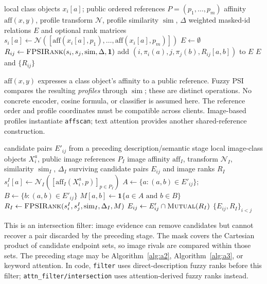 \documentclass[11pt]{article}
\newcommand{\aff}{\mathrm{aff}}
\newcommand{\mutual}{\textsc{Mutual}}
\newcommand{\fprank}{\textsc{FPSIRank}}
\newcommand{\ind}{\mathbf{1}}
\begin{document}
\begin{algorithm}[H]
\caption{Affinity-based relation construction using fuzzy PSI}\label{alg:a3}
\small\begin{algorithmic}[1]
\Require local class objects $x_i[a]$; public ordered references $P=(p_1,\ldots,p_m)$
\Require affinity $\aff(x,y)$, profile transform $\mathcal N$, profile similarity $\operatorname{sim}$, $\Delta$
\Ensure weighted masked-id relations $E$ and optional rank matrices
 \State $s_i[a]\gets\mathcal N([\aff(x_i[a],p_1),\ldots,\aff(x_i[a],p_m)])$
\EndFor
\State $E\gets\emptyset$
 \State $R_{ij}\gets\fprank(s_i,s_j,\operatorname{sim},\Delta,\mathbf 1)$ 
 \For{each $(a,b)\in\mutual(R_{ij})$}
  \State add $(i,\pi_i(a),j,\pi_j(b),R_{ij}[a,b])$ to $E$
 \EndFor
\EndFor
\State \Return $E$ and $\{R_{ij}\}$
\end{algorithmic}
\smallskip\noindent\small
$\aff(x,y)$ expresses a class object's affinity to a public reference.
Fuzzy PSI compares the resulting \emph{profiles} through $\operatorname{sim}$;
these are distinct operations. No concrete encoder, cosine formula, or
classifier is assumed here. The reference order and profile coordinates must
be compatible across clients. Image-based profiles instantiate
\texttt{affscan}; text attention provides another shared-reference construction.
\end{algorithm}

\clearpage
\begin{algorithm}[H]
\caption{Image filter for candidate relations (abstract cascade)}\label{alg:a4}
\small\begin{algorithmic}[1]
\Require candidate pairs $E'_{ij}$ from a preceding description/semantic stage
\Require local image-class objects $X_i^a$, public image references $P_I$
\Require image affinity $\aff_I$, transform $\mathcal N_I$, similarity $\operatorname{sim}_I$, $\Delta_I$
\Ensure surviving candidate pairs $E_{ij}$ and image ranks $R_I$
 \State $s_i^I[a]\gets\mathcal N_I([\aff_I(X_i^a,p)]_{p\in P_I})$
\EndFor
{}
 \State $A\gets\{a:(a,b)\in E'_{ij}\}$; $B\gets\{b:(a,b)\in E'_{ij}\}$
 \State $M[a,b]\gets\ind\{a\in A\text{ and }b\in B\}$
 \State $R_I\gets\fprank(s_i^I,s_j^I,\operatorname{sim}_I,\Delta_I,M)$ 
 \State $E_{ij}\gets E'_{ij}\cap\mutual(R_I)$
\EndFor
\State \Return $\{E_{ij},R_I\}_{i<j}$
\end{algorithmic}
\smallskip\noindent\small
This is an intersection filter: image evidence can remove candidates but
cannot recover a pair discarded by the preceding stage. The mask covers the
Cartesian product of candidate endpoint sets, so image rivals are compared
within those sets. The preceding stage may be Algorithm~\ref{alg:a2},
Algorithm~\ref{alg:a3}, or keyword attention. In code,
\texttt{filter} uses direct-description fuzzy ranks before this filter;
\texttt{attn\_filter/intersection} uses attention-derived fuzzy ranks instead.
\end{algorithm}
\end{document}
